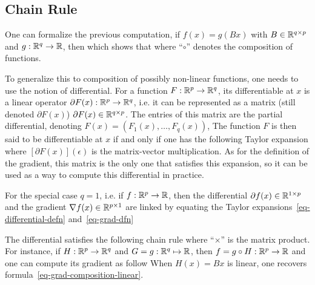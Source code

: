 \subsection{Chain Rule}

One can formalize the previous computation, if $f(x) = g(Bx)$ with $B \in \mathbb{R}^{q \times p}$ and $g : \mathbb{R}^q \rightarrow \mathbb{R}$, then
which shows that 
where ``$\circ$'' denotes the composition of functions.

To generalize this to composition of possibly non-linear functions, one needs to use the notion of differential. For a function $F : \mathbb{R}^p \rightarrow \mathbb{R}^q$, its differentiable at $x$ is a linear operator $\partial F(x) : \mathbb{R}^{p} \rightarrow \mathbb{R}^q$, i.e. it can be represented as a matrix (still denoted $\partial F(x)$) $\partial F(x) \in \mathbb{R}^{q \times p}$.
%
The entries of this matrix are the partial differential, denoting $F(x)=(F_1(x), \ldots, F_q(x))$, 
The function $F$ is then said to be differentiable at $x$ if and only if one has the following Taylor expansion 
where $[\partial F(x)](\epsilon)$ is the matrix-vector multiplication. As for the definition of the gradient, this matrix is the only one that satisfies this expansion, so it can be used as a way to compute this differential in practice.

For the special case $q=1$, i.e. if $f : \mathbb{R}^p \rightarrow \mathbb{R}$, then the differential $\partial f(x) \in \mathbb{R}^{1 \times p}$ and the gradient $\nabla f(x) \in \mathbb{R}^{p \times 1}$ are linked by equating the Taylor expansions~\eqref{eq-differential-defn} and~\eqref{eq-grad-dfn}

The differential satisfies the following chain rule 
where ``$\times$'' is the matrix product. For instance, if $H : \mathbb{R}^p \rightarrow \mathbb{R}^q$ and $G = g : \mathbb{R}^q \mapsto \mathbb{R}$, then $f = g \circ H : \mathbb{R}^p \rightarrow \mathbb{R}$ and one can compute its gradient as follow
When $H(x)=Bx$ is linear, one recovers formula~\eqref{eq-grad-composition-linear}.


